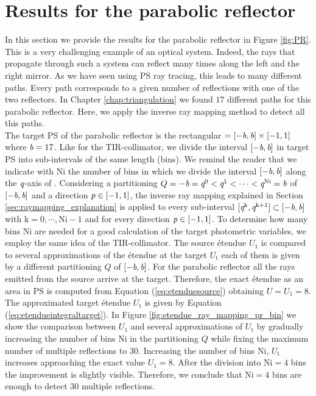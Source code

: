 \section{Results for the parabolic reflector}\label{sec:PR}
In this section we provide the results for the parabolic reflector in Figure \ref{fig:PR}.
This is a very challenging example of an optical system. Indeed, the rays that propagate through such a system can reflect many times along the left and the right mirror. As we have seen using PS ray tracing, this leads to many different paths. Every path corresponds to a given number of reflections with one of the two reflectors. In Chapter \ref{chap:triangulation} we found $17$ different paths for this parabolic reflector. Here, we apply the inverse ray mapping method to detect all this paths. \\ \indent
The target PS of the parabolic reflector is the rectangular $=[-\textit{b}, \textit{b}]\times[-1,1]$ where $\textit{b}=17$. Like for the TIR-collimator, we divide the interval $[-\textit{b}, \textit{b}]$ in target PS into sub-intervals of the same length (bins). We remind the reader that we indicate with $\textrm{Ni}$ the number of bins in which we divide the interval $[-\textit{b}, \textit{b}]$ along the $\textit{q}$-axis of . Considering a partitioning $Q = -\textit{b}=\textit{q}^{0}<\textit{q}^{1}<\cdots<\textit{q}^{\textrm{Ni}}=\textit{b}$ of $[-\textit{b}, \textit{b}]$ and a direction $\textit{p}\in[-1,1]$, the inverse ray mapping explained in Section \ref{sec:raymapping_explanation} is applied to every sub-interval $[\textit{q}^{\textrm{k}}, \textit{q}^{\textrm{k+1}}]\subset[-\textit{b}, \textit{b}]$ with $\textrm{k}=0, \cdots, \textrm{Ni}-1$ and for every direction $\textit{p}\in[-1,1]$. To determine how many bins $\textrm{Ni}$ are needed for a good calculation of the target photometric variables, we employ the same idea of the TIR-collimator. The source \'{e}tendue $U_1$ is compared to several approximations of the \'{e}tendue at the target $U_{\textrm{t}}$ each of them is given by a different partitioning $Q$ of $[-\textit{b}, \textit{b}]$. For the parabolic reflector all the rays emitted from the source arrive at the target. Therefore, the exact \'{e}tendue as an area in PS is computed from Equation (\ref{eq:etenduesource}) obtaining $U=U_1=8$. The approximated target \'{e}tendue $U_{\textrm{t}}$ is given by Equation (\ref{eq:etendueintegraltarget}). In Figure \ref{fig:etendue_ray_mapping_pr_bin} we show the comparison between $U_1$ and several approximations of $U_{\textrm{t}}$ by gradually increasing the number of bins $\textrm{Ni}$ in the partitioning $Q$ while fixing the maximum number of multiple reflections to $30$. Increasing the number of bins $\textrm{Ni}$, $U_{\textrm{t}}$ increases approaching the exact value $U_1=8$. After the division into $\textrm{Ni}=4$ bins the improvement is slightly visible. Therefore, we conclude that $\textrm{Ni}=4$ bins are enough to detect $30$ multiple reflections.
